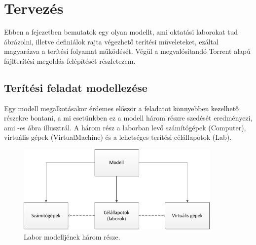 \chapter{Tervezés}
\label{chp:design}
Ebben a fejezetben bemutatok egy olyan modellt, ami oktatási laborokat tud ábrázolni, illetve definiálok rajta végezhető terítési műveleteket, ezáltal magyarázva a terítési folyamat működését. Végül a megvalósítandó Torrent alapú fájlterítési megoldás felépítését részletezem.

\section{Terítési feladat modellezése}
\label{design_model}

Egy modell megalkotásakor érdemes először a feladatot könnyebben kezelhető részekre bontani, a mi esetünkben ez a modell három részre szedését eredményezi, ami -es ábra illusztrál. A három rész a laborban levő számítógépek (Computer), virtuális gépek (VirtualMachine) és a lehetséges terítési célállapotok (Lab).

\begin{figure}[ht]
	\centering
	\includegraphics[width=100mm, keepaspectratio]{figures/design_modelparts.png}
	\caption{Labor modelljének három része.}
	\label{fig:designmodelparts}
\end{figure}

